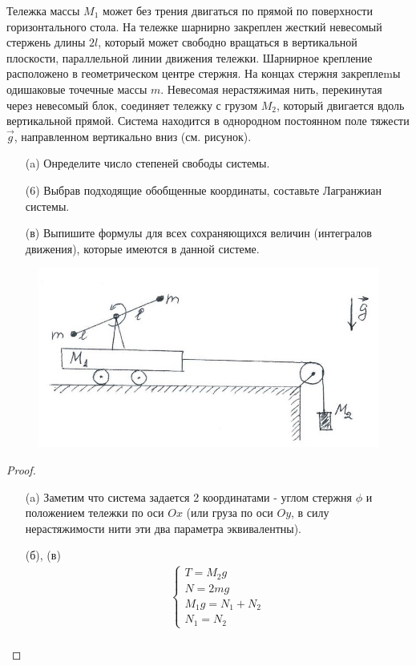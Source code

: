 \begin{prob}
Тележка массы $M_1$ может без трения двигаться по прямой по поверхности горизонтального стола. На тележке шарнирно закреплен жесткий невесомый стержень длины $2 l$, который может свободно вращаться в вертикальной плоскости, параллельной линии движения тележки. Шарнирное крепление расположено в геометрическом центре стержня. На концах стержня закреплеmы одишаковые точечные массы $m$. Невесомая нерастяжимая нить, перекинутая через невесомый блок, соединяет тележку с грузом $M_2$, который двигается вдоль вертикальной прямой. Система находится в однородном постоянном поле тяжести $\vec{g}$, направленном вертикально вниз (см. рисунок).
\begin{itemize}
\item[]
\item[(a)] Онределите число степеней свободы системы.
\item[(6)] Выбрав подходящие обобщенные координаты, составьте Лагранжиан системы.
\item[(в)] Выпишите формулы для всех сохраняющихся величин (интегралов движения), которые имеются в данной системе.
\end{itemize}
\begin{figure}[h!]
\includegraphics[scale=0.55]{IMG/img_2}
\end{figure}
\end{prob}

\begin{proof}
\begin{itemize}
\item[]
\item[(a)] Заметим что система задается 2 координатами - углом стержня $\phi$ и положением тележки по оси $O x$ (или груза по оси $O y$, в силу нерастяжимости нити эти два параметра эквивалентны).
\item[(б), (в)] 
    \begin{gather*}
        \begin{cases}
            T = M_2 g\\
            N = 2 m g\\
            M_1 g = N_1 + N_2\\
            N_1 = N_2
        \end{cases}\\
    \end{gather*}
\end{itemize}
\end{proof}
\vskip 0.6in